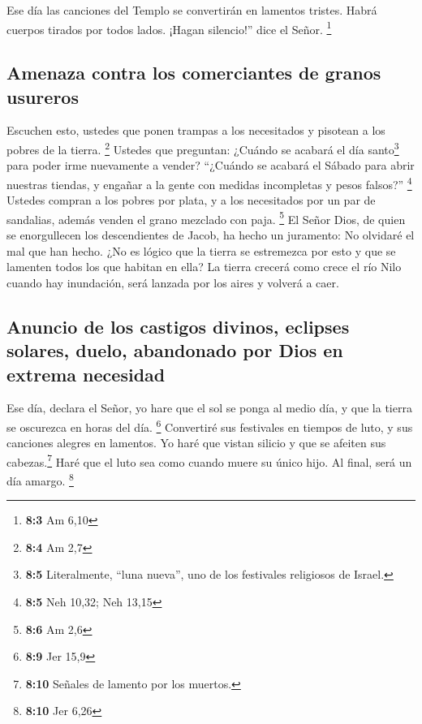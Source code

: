  Ese día las canciones del Templo se convertirán en
lamentos tristes. Habrá cuerpos tirados por todos lados. ¡Hagan
silencio!'' dice el Señor. \footnote{\textbf{8:3} Am 6,10}

\hypertarget{amenaza-contra-los-comerciantes-de-granos-usureros}{%
\subsection{Amenaza contra los comerciantes de granos
usureros}\label{amenaza-contra-los-comerciantes-de-granos-usureros}}

 Escuchen esto, ustedes que ponen trampas a los
necesitados y pisotean a los pobres de la tierra. \footnote{\textbf{8:4}
  Am 2,7}  Ustedes que preguntan: ¿Cuándo se acabará el
día santo\footnote{\textbf{8:5} Literalmente, ``luna nueva'', uno de los
  festivales religiosos de Israel.} para poder irme nuevamente a vender?
``¿Cuándo se acabará el Sábado para abrir nuestras tiendas, y engañar a
la gente con medidas incompletas y pesos falsos?'' \footnote{\textbf{8:5}
  Neh 10,32; Neh 13,15}  Ustedes compran a los pobres por
plata, y a los necesitados por un par de sandalias, además venden el
grano mezclado con paja. \footnote{\textbf{8:6} Am 2,6} 
El Señor Dios, de quien se enorgullecen los descendientes de Jacob, ha
hecho un juramento: No olvidaré el mal que han hecho.  ¿No
es lógico que la tierra se estremezca por esto y que se lamenten todos
los que habitan en ella? La tierra crecerá como crece el río Nilo cuando
hay inundación, será lanzada por los aires y volverá a caer.

\hypertarget{anuncio-de-los-castigos-divinos-eclipses-solares-duelo-abandonado-por-dios-en-extrema-necesidad}{%
\subsection{Anuncio de los castigos divinos, eclipses solares, duelo,
abandonado por Dios en extrema
necesidad}\label{anuncio-de-los-castigos-divinos-eclipses-solares-duelo-abandonado-por-dios-en-extrema-necesidad}}

 Ese día, declara el Señor, yo hare que el sol se ponga al
medio día, y que la tierra se oscurezca en horas del día. \footnote{\textbf{8:9}
  Jer 15,9}  Convertiré sus festivales en tiempos de
luto, y sus canciones alegres en lamentos. Yo haré que vistan silicio y
que se afeiten sus cabezas.\footnote{\textbf{8:10} Señales de lamento
  por los muertos.} Haré que el luto sea como cuando muere su único
hijo. Al final, será un día amargo. \footnote{\textbf{8:10} Jer 6,26}

